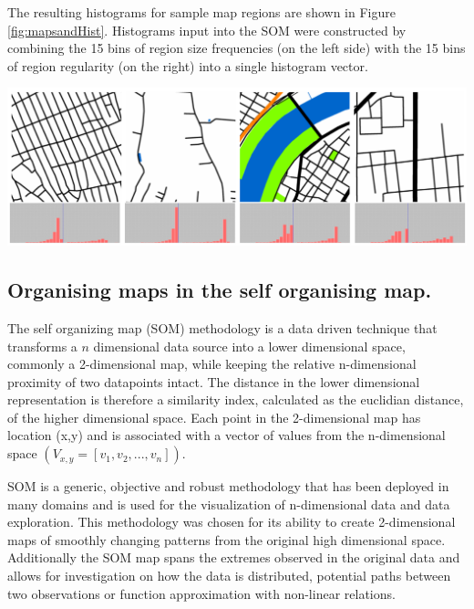 \documentclass{nature}
\makeatletter
\renewenvironment*{figure}{\@float{figure}}{\end@float}
\makeatother
\begin{document}
\begin{methods}
The resulting histograms for sample map regions are shown in Figure \ref{fig:mapsandHist}. Histograms input into the SOM were constructed by combining the 15 bins of region size frequencies (on the left side) with the 15 bins of region regularity (on the right) into a single histogram vector.


\begin{figure}
    \centering    
\includegraphics[scale=0.55]{Images/HistSamples.png}  
\caption{\bf Four samples of map regions (top) and resulting histograms (bottom). Region size and regularity are joined into a combined histogram, with size frequencies on the left side of the graph and regularity on the right.}    
 \label{fig:mapsandHist}  
\end{figure} 

\subsection{Organising maps in the self organising map.}\label{methodscluster}
The self organizing map (SOM) methodology\cite{Kohonen1982} is a data driven technique that transforms a $n$ dimensional data source into a lower dimensional space, commonly a 2-dimensional map, while keeping the relative n-dimensional proximity of two datapoints intact. The distance in the lower dimensional representation is therefore a similarity index, calculated as the euclidian distance, of the higher dimensional space. Each point in the 2-dimensional map has location (x,y) and is associated with a vector of values from the n-dimensional space $(V_{x,y} = [v_{1},v_{2},...,v_{n}])$.

SOM is a generic, objective and robust methodology that has been deployed in many domains and is used for the visualization of n-dimensional data and data exploration\cite{Koleheimen2004}. This methodology was chosen for its ability to create 2-dimensional maps of smoothly changing patterns from the original high dimensional space. Additionally the SOM map spans the extremes observed in the original data and allows for investigation on how the data is distributed, potential paths between two observations or function approximation with non-linear relations\cite{Barreto2006}. 


\end{methods}
\end{document}
